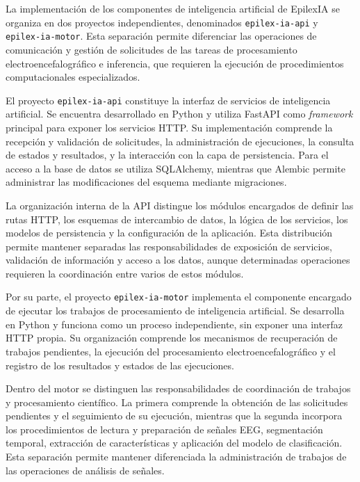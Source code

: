 La implementación de los componentes de inteligencia
artificial de EpilexIA se organiza en dos proyectos
independientes, denominados \texttt{epilex-ia-api}
y \texttt{epilex-ia-motor}. Esta separación permite
diferenciar las operaciones de comunicación y gestión
de solicitudes de las tareas de procesamiento
electroencefalográfico e inferencia, que requieren
la ejecución de procedimientos computacionales
especializados.

El proyecto \texttt{epilex-ia-api} constituye la
interfaz de servicios de inteligencia artificial.
Se encuentra desarrollado en Python y utiliza
FastAPI como \textit{framework} principal para exponer
los servicios HTTP. Su implementación comprende
la recepción y validación de solicitudes, la
administración de ejecuciones, la consulta de
estados y resultados, y la interacción con la
capa de persistencia. Para el acceso a la base
de datos se utiliza SQLAlchemy, mientras que
Alembic permite administrar las modificaciones
del esquema mediante migraciones.

La organización interna de la API distingue
los módulos encargados de definir las rutas
HTTP, los esquemas de intercambio de datos,
la lógica de los servicios, los modelos de
persistencia y la configuración de la aplicación.
Esta distribución permite mantener separadas
las responsabilidades de exposición de servicios,
validación de información y acceso a los datos,
aunque determinadas operaciones requieren
la coordinación entre varios de estos módulos.

Por su parte, el proyecto
\texttt{epilex-ia-motor} implementa el componente
encargado de ejecutar los trabajos de procesamiento
de inteligencia artificial. Se desarrolla en Python
y funciona como un proceso independiente, sin
exponer una interfaz HTTP propia. Su organización
comprende los mecanismos de recuperación de
trabajos pendientes, la ejecución del procesamiento
electroencefalográfico y el registro de los
resultados y estados de las ejecuciones.

Dentro del motor se distinguen las responsabilidades
de coordinación de trabajos y procesamiento
científico. La primera comprende la obtención de
las solicitudes pendientes y el seguimiento de
su ejecución, mientras que la segunda incorpora
los procedimientos de lectura y preparación
de señales EEG, segmentación temporal, extracción
de características y aplicación del modelo
de clasificación. Esta separación permite
mantener diferenciada la administración de
trabajos de las operaciones de análisis de señales.

